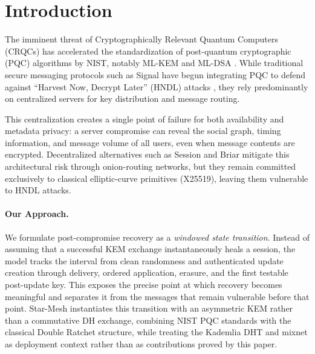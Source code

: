 \documentclass[11pt,a4paper]{article}
\theoremstyle{remark}
\theoremstyle{plain}
\begin{document}
\newpage
\tableofcontents
\newpage

\section{Introduction}

The imminent threat of Cryptographically Relevant Quantum Computers (CRQCs) has accelerated the
standardization of post-quantum cryptographic (PQC) algorithms by NIST, notably ML-KEM
\cite{nist_fips203} and ML-DSA \cite{nist_fips204}.  While traditional secure messaging
protocols such as Signal have begun integrating PQC \cite{signal_pqxdh} to defend against
``Harvest Now, Decrypt Later'' (HNDL) attacks \cite{mosca2018cybersecurity}, they rely
predominantly on centralized servers for key distribution and message routing.

This centralization creates a single point of failure for both availability and metadata
privacy: a server compromise can reveal the social graph, timing information, and message volume
of all users, even when message contents are encrypted.  Decentralized alternatives such as
Session \cite{session_protocol} and Briar \cite{briar_design} mitigate this architectural risk
through onion-routing networks, but they remain committed exclusively to classical
elliptic-curve primitives (X25519), leaving them vulnerable to HNDL attacks.

\paragraph{Our Approach.}
We formulate post-compromise recovery as a \emph{windowed state transition}.  Instead of
assuming that a successful KEM exchange instantaneously heals a session, the model tracks the
interval from clean randomness and authenticated update creation through delivery, ordered
application, erasure, and the first testable post-update key.  This exposes the precise point
at which recovery becomes meaningful and separates it from the messages that remain vulnerable
before that point.  Star-Mesh instantiates this transition with an asymmetric KEM rather than a
commutative DH exchange, combining NIST PQC standards
\cite{nist_fips203,nist_fips204} with the classical Double Ratchet structure, while treating
the Kademlia DHT and mixnet as deployment context rather than as contributions proved by this
paper.
\end{document}
